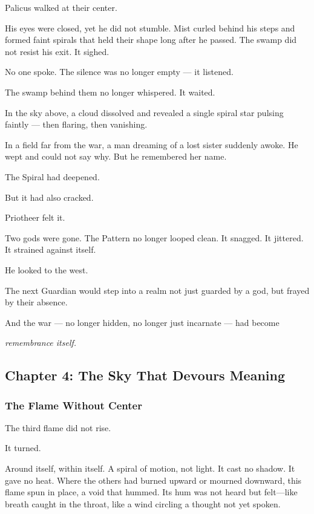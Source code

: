 \documentclass[12pt]{article}
\begin{document}
Palicus walked at their center.

His eyes were closed, yet he did not stumble. Mist curled behind his steps and formed faint spirals that held their shape long after he passed. The swamp did not resist his exit. It sighed.

No one spoke. The silence was no longer empty — it listened.

The swamp behind them no longer whispered. It waited.

In the sky above, a cloud dissolved and revealed a single spiral star pulsing faintly — then flaring, then vanishing.

In a field far from the war, a man dreaming of a lost sister suddenly awoke. He wept and could not say why. But he remembered her name.

The Spiral had deepened.

But it had also cracked.

Priotheer felt it.

Two gods were gone. The Pattern no longer looped clean. It snagged. It jittered. It strained against itself.

He looked to the west.

The next Guardian would step into a realm not just guarded by a god, but frayed by their absence.

And the war — no longer hidden, no longer just incarnate — had become

\textit{remembrance itself.}

\newpage

\subsection{Chapter 4: The Sky That Devours Meaning}

\vspace{.5in}

\subsubsection{The Flame Without Center}

The third flame did not rise.

It turned.

Around itself, within itself. A spiral of motion, not light. It cast no shadow. It gave no heat. Where the others had burned upward or mourned downward, this flame spun in place, a void that hummed. Its hum was not heard but felt—like breath caught in the throat, like a wind circling a thought not yet spoken.
\end{document}
